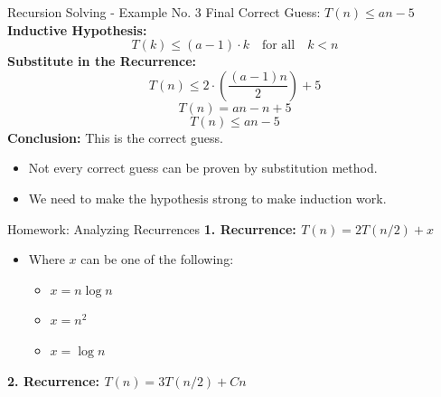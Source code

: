 \begin{frame}{Recursion Solving - Example No. 3}
    {Final Correct Guess: \( T(n) \leq an - 5 \)}
    \textbf{Inductive Hypothesis:} 
    \[
    T(k) \leq (a - 1) \cdot k \quad \text{for all} \quad k < n
    \]
    \textbf{Substitute in the Recurrence:}
    \[
    T(n) \leq 2 \cdot \left( \frac{(a - 1) n}{2} \right) + 5
    \]
    \[
    T(n) = an - n + 5
    \]
    \[
    T(n) \leq an - 5
    \]
    \textbf{Conclusion:} This is the correct guess.
    \begin{itemize}
        \item Not every correct guess can be proven by substitution method.
        \item We need to make the hypothesis strong to make induction work.
    \end{itemize}
\end{frame}

\begin{frame}{Homework: Analyzing Recurrences}
    \textbf{1. Recurrence: \( T(n) = 2T(n/2) + x \)}
    \begin{itemize}
        \item Where \( x \) can be one of the following:
        \begin{itemize}
            \item \( x = n \log n \)
            \item \( x = n^2 \)
            \item \( x = \log n \)
        \end{itemize}
    \end{itemize}

    \vspace{0.4cm}

    \textbf{2. Recurrence: \( T(n) = 3T(n/2) + Cn \)}
    
\end{frame}

